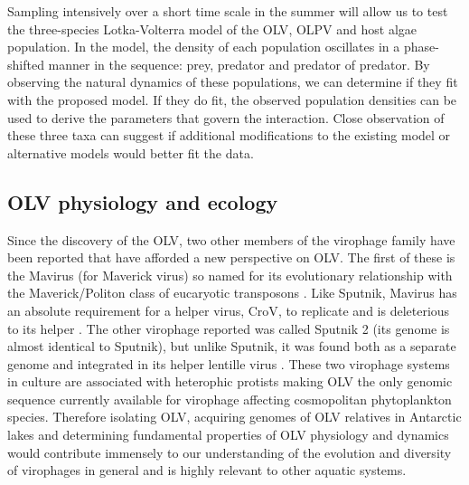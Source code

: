 Sampling intensively over a short time scale in the summer will allow us to test the three-species Lotka-Volterra model of the \ac{OLV}, \ac{OLPV} and host algae population.
In the model, the density of each population oscillates in a phase-shifted manner in the sequence: prey, predator and predator of predator.
By observing the natural dynamics of these populations, we can determine if they fit with the proposed model.
If they do fit, the observed population densities can be used to derive the parameters that govern the interaction.
Close observation of these three taxa can suggest if additional modifications to the existing model or alternative models would better fit the data.

\subsection{\acs{OLV} physiology and ecology}
Since the discovery of the \ac{OLV}, two other members of the virophage family have been reported that have afforded a new perspective on \ac{OLV}.
The first of these is the Mavirus (for Maverick virus) so named for its evolutionary relationship with the Maverick/Politon class of eucaryotic transposons \cite{Fischer2011a}.
Like Sputnik, Mavirus has an absolute requirement for a helper virus, \ac{CroV}, to replicate and is deleterious to its helper \cite{Fischer2011a}.
The other virophage reported was called Sputnik 2 (its genome is almost identical to Sputnik), but unlike Sputnik, it was found both as a separate genome and integrated in its helper lentille virus \cite{Desnues2012}.
These two virophage systems in culture are associated with heterophic protists making \ac{OLV} the only genomic sequence currently available for virophage affecting cosmopolitan phytoplankton species.
Therefore isolating \ac{OLV}, acquiring genomes of \ac{OLV} relatives in Antarctic lakes and determining fundamental properties of \ac{OLV} physiology and dynamics would contribute immensely to our understanding of the evolution and diversity of virophages in general and is highly relevant to other aquatic systems.

